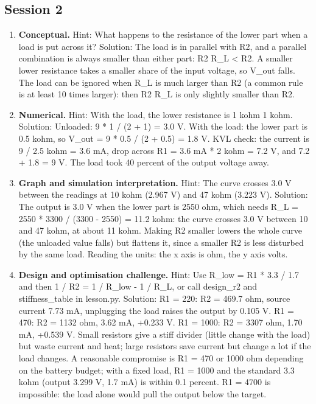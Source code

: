 \documentclass[11pt,a4paper]{article}
\begin{document}
\subsection*{Session 2}
\begin{enumerate}[nosep]
\item \textbf{Conceptual.} Hint: What happens to the resistance of the lower part when a load is put across it? Solution: The load is in parallel with R2, and a parallel combination is always smaller than either part: R2 \textbar{}\textbar{} R\_L \textless{} R2. A smaller lower resistance takes a smaller share of the input voltage, so V\_out falls. The load can be ignored when R\_L is much larger than R2 (a common rule is at least 10 times larger): then R2 \textbar{}\textbar{} R\_L is only slightly smaller than R2.
\item \textbf{Numerical.} Hint: With the load, the lower resistance is 1 kohm \textbar{}\textbar{} 1 kohm. Solution: Unloaded: 9 * 1 / (2 + 1) = 3.0 V. With the load: the lower part is 0.5 kohm, so V\_out = 9 * 0.5 / (2 + 0.5) = 1.8 V. KVL check: the current is 9 / 2.5 kohm = 3.6 mA, drop across R1 = 3.6 mA * 2 kohm = 7.2 V, and 7.2 + 1.8 = 9 V. The load took 40 percent of the output voltage away.
\item \textbf{Graph and simulation interpretation.} Hint: The curve crosses 3.0 V between the readings at 10 kohm (2.967 V) and 47 kohm (3.223 V). Solution: The output is 3.0 V when the lower part is 2550 ohm, which needs R\_L = 2550 * 3300 / (3300 - 2550) = 11.2 kohm: the curve crosses 3.0 V between 10 and 47 kohm, at about 11 kohm. Making R2 smaller lowers the whole curve (the unloaded value falls) but flattens it, since a smaller R2 is less disturbed by the same load. Reading the units: the x axis is ohm, the y axis volts.
\item \textbf{Design and optimisation challenge.} Hint: Use R\_low = R1 * 3.3 / 1.7 and then 1 / R2 = 1 / R\_low - 1 / R\_L, or call design\_r2 and stiffness\_table in lesson.py. Solution: R1 = 220: R2 = 469.7 ohm, source current 7.73 mA, unplugging the load raises the output by 0.105 V. R1 = 470: R2 = 1132 ohm, 3.62 mA, +0.233 V. R1 = 1000: R2 = 3307 ohm, 1.70 mA, +0.539 V. Small resistors give a stiff divider (little change with the load) but waste current and heat; large resistors save current but change a lot if the load changes. A reasonable compromise is R1 = 470 or 1000 ohm depending on the battery budget; with a fixed load, R1 = 1000 and the standard 3.3 kohm (output 3.299 V, 1.7 mA) is within 0.1 percent. R1 = 4700 is impossible: the load alone would pull the output below the target.
\end{enumerate}
\end{document}
